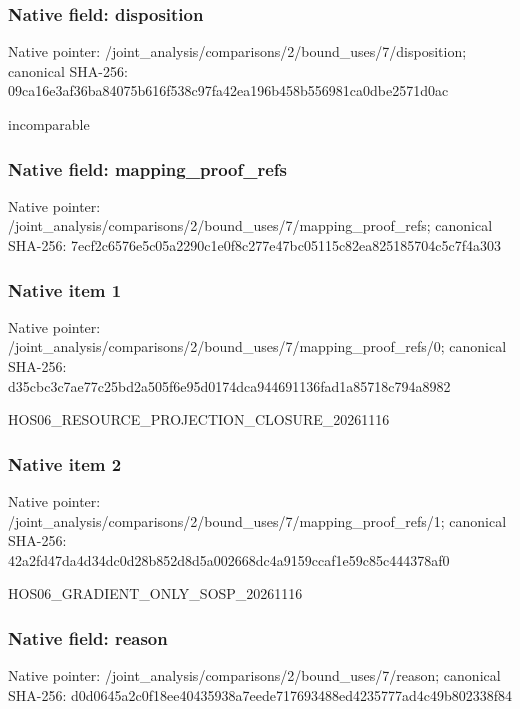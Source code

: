 \documentclass[10pt,a4paper]{article}
\begin{document}
\subsubsection{Native field: disposition}
Native pointer: /joint\_\allowbreak{}analysis/comparisons/2/bound\_\allowbreak{}uses/7/disposition; canonical SHA-256: 09ca16e3af36ba84075b616f538c97fa42ea196b458b556981ca0dbe2571d0ac

\begingroup\raggedright\sloppy incomparable\par\endgroup

\subsubsection{Native field: mapping\_\allowbreak{}proof\_\allowbreak{}refs}
Native pointer: /joint\_\allowbreak{}analysis/comparisons/2/bound\_\allowbreak{}uses/7/mapping\_\allowbreak{}proof\_\allowbreak{}refs; canonical SHA-256: 7ecf2c6576e5c05a2290c1e0f8c277e47bc05115c82ea825185704c5c7f4a303

\subsubsection{Native item 1}
Native pointer: /joint\_\allowbreak{}analysis/comparisons/2/bound\_\allowbreak{}uses/7/mapping\_\allowbreak{}proof\_\allowbreak{}refs/0; canonical SHA-256: d35cbc3c7ae77c25bd2a505f6e95d0174dca944691136fad1a85718c794a8982

\begingroup\raggedright\sloppy HOS06\_\allowbreak{}RESOURCE\_\allowbreak{}PROJECTION\_\allowbreak{}CLOSURE\_\allowbreak{}20261116\par\endgroup

\subsubsection{Native item 2}
Native pointer: /joint\_\allowbreak{}analysis/comparisons/2/bound\_\allowbreak{}uses/7/mapping\_\allowbreak{}proof\_\allowbreak{}refs/1; canonical SHA-256: 42a2fd47da4d34dc0d28b852d8d5a002668dc4a9159ccaf1e59c85c444378af0

\begingroup\raggedright\sloppy HOS06\_\allowbreak{}GRADIENT\_\allowbreak{}ONLY\_\allowbreak{}SOSP\_\allowbreak{}20261116\par\endgroup

\subsubsection{Native field: reason}
Native pointer: /joint\_\allowbreak{}analysis/comparisons/2/bound\_\allowbreak{}uses/7/reason; canonical SHA-256: d0d0645a2c0f18ee40435938a7eede717693488ed4235777ad4c49b802338f84
\end{document}

